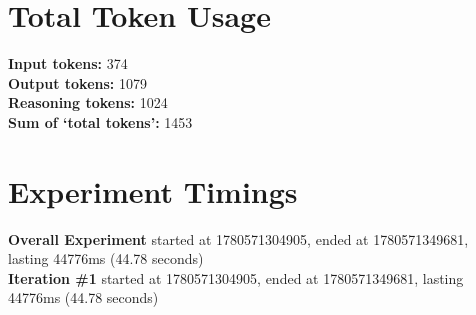 \documentclass{article}
\begin{document}
\section*{Total Token Usage}
\textbf{Input tokens: }374
\\\textbf{Output tokens: }1079
\\\textbf{Reasoning tokens: }1024
\\\textbf{Sum of `total tokens': }1453
\section*{Experiment Timings}
\textbf{Overall Experiment} started at 1780571304905, ended at 1780571349681, lasting 44776ms (44.78 seconds)
\\\textbf{Iteration \#1} started at 1780571304905, ended at 1780571349681, lasting 44776ms (44.78 seconds)
\end{document}
